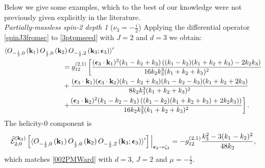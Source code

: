 \documentclass[11pt,a4paper]{article}
\begin{document}
Below we give some examples, which to the best of our knowledge were not previously given explicitly in the literature.\\

\emph{Partially-massless spin-2 depth 1} ($\nu_3 = -\tfrac{i}{2}$)
Applying the differential operator \eqref{spinJ3fromsc} to \eqref{3ptpmseed} with $J=2$ and $d=3$ we obtain:
\begin{align}
   & \langle O_{-\frac{i}{2},0}\left({\bf k}_1\right)O_{\frac{i}{2},0}\left({\bf k}_2\right)O_{-\frac{i}{2},2}\left({\bf k}_3;\boldsymbol{\epsilon}_3\right)  \rangle^\prime \\& \nonumber \hspace*{3cm}=g^{\left(2,1\right)}_{12}\left[\frac{(\boldsymbol{\epsilon}_3\cdot {\bf k}_1)^2 (k_1-k_2+k_3) \left((k_1-k_2) (k_1+k_2+k_3)-2 k_2 k_3\right)}{16 k_2 k_3^3 (k_1+k_2+k_3)^2}\right.\\\nonumber
    &\hspace*{3cm}+\frac{(\boldsymbol{\epsilon}_3\cdot {\bf k}_1) (\boldsymbol{\epsilon}_3\cdot {\bf k}_2) (k_1-k_2+k_3) (k_1-k_2-k_3) (k_1+k_2+2 k_3)}{8 k_2 k_3^3 (k_1+k_2+k_3)^2}\\\nonumber
    &\hspace*{3cm}\left.+\frac{(\boldsymbol{\epsilon}_3\cdot {\bf k}_2)^2 (k_1-k_2-k_3) \left((k_1-k_2) (k_1+k_2+k_3)+2 k_2 k_3)\right)}{16 k_2 k_3^3 (k_1+k_2+k_3)^2}\right]. 
\end{align}
The helicity-$0$ component is 
\begin{align}
    \widehat{\mathcal{E}}^{({\bf k}_3)}_{2,0}\left[\langle O_{-\frac{i}{2},0}\left({\bf k}_1\right)O_{\frac{i}{2},0}\left({\bf k}_2\right)O_{-\frac{i}{2},2}\left({\bf k}_3;\boldsymbol{\epsilon}_3\right)  \rangle^\prime\right]\Big|_{\boldsymbol{\epsilon}_3 \to \zeta_3}=-g^{\left(2,1\right)}_{12}\frac{k^2_3-3 (k_1-k_2)^2}{48 k_2},
\end{align}
which matches \eqref{002PMWard} with $d=3$, $J=2$ and $\mu = -\tfrac{i}{2}$.\\
\end{document}
